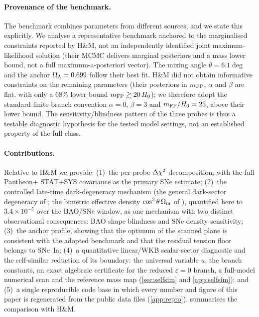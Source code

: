 \paragraph{Provenance of the benchmark.}
The benchmark combines parameters from different sources, and we state this explicitly. We analyse a representative benchmark anchored to the marginalised constraints reported by H\&M, not an independently identified joint maximum-likelihood solution (their MCMC delivers marginal posteriors and a mass lower bound, not a full maximum-a-posteriori vector). The mixing angle $\theta=6.1\deg$ and the anchor $\Omega_{\Lambda}=0.699$ follow their best fit. H\&M did not obtain informative constraints on the remaining parameters (their posteriors in $m_{\mathrm{FP}}$, $\alpha$ and $\beta$ are flat, with only a 68\% lower bound $m_{\mathrm{FP}}\gtrsim20\,H_0$); we therefore adopt the standard finite-branch convention $\alpha=0$, $\beta=3$ and $m_{\mathrm{FP}}/H_0=25$, above their lower bound. The sensitivity/blindness pattern of the three probes is thus a testable diagnostic hypothesis for the tested model settings, not an established property of the full class.

\paragraph{Contributions.}
Relative to H\&M we provide:
(1)~the per-probe $\Delta\chi^2$ decomposition, with the full Pantheon+ STAT+SYS covariance as the primary SNe estimate;
(2)~the controlled late-time dark-degeneracy mechanism (the general dark-sector degeneracy of \citet{Kunz2009}; the bimetric effective density $\cos^2\theta\,\Omega_{\mathrm m}$ of \citet{Hogas2021}), quantified here to $3.4\times10^{-5}$ over the BAO/SNe window, as one mechanism with two distinct observational consequences: BAO shape blindness and SNe density sensitivity;
(3)~the anchor profile, showing that the optimum of the scanned plane is consistent with the adopted benchmark and that the residual tension floor belongs to SNe~Ia;
(4)~a quantitative linear/WKB scalar-sector diagnostic and the self-similar reduction of its boundary: the universal variable $u$, the branch constants, an exact algebraic certificate for the reduced $\varepsilon=0$ branch, a full-model numerical scan and the reference mass map (\cref{sec:selfsim} and \cref{app:selfsim}); and
(5)~a single reproducible code base in which every number and figure of this paper is regenerated from the public data files (\cref{app:repro}).
 summarises the comparison with H\&M.

